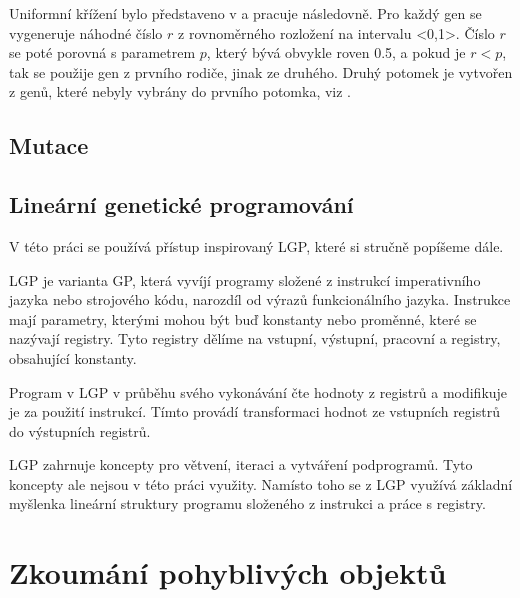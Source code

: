 Uniformní křížení bylo představeno v  a pracuje následovně.
Pro každý gen se vygeneruje náhodné číslo $r$ z rovnoměrného rozložení na intervalu <0,1>.
Číslo $r$ se poté porovná s parametrem $p$, který bývá obvykle roven 0.5, a pokud je $r < p$, tak se použije gen z prvního rodiče, jinak ze druhého.
Druhý potomek je vytvořen z genů, které nebyly vybrány do prvního potomka, viz .

\section{Mutace}



\section{Lineární genetické programování}
V této práci se používá přístup inspirovaný LGP, které si stručně popíšeme dále.

LGP je varianta GP, která vyvíjí programy složené z instrukcí imperativního jazyka nebo strojového kódu, narozdíl od výrazů funkcionálního jazyka.
Instrukce mají parametry, kterými mohou být buď konstanty nebo proměnné, které se nazývají registry.
Tyto registry dělíme na vstupní, výstupní, pracovní a registry, obsahující konstanty.

Program v LGP v průběhu svého vykonávání čte hodnoty z registrů a modifikuje je za použití instrukcí.
Tímto provádí transformaci hodnot ze vstupních registrů do výstupních registrů.

LGP zahrnuje koncepty pro větvení, iteraci a vytváření podprogramů.
Tyto koncepty ale nejsou v této práci využity.
Namísto toho se z LGP využívá základní myšlenka lineární struktury programu složeného z instrukci a práce s registry.



\chapter{Zkoumání pohyblivých objektů}



